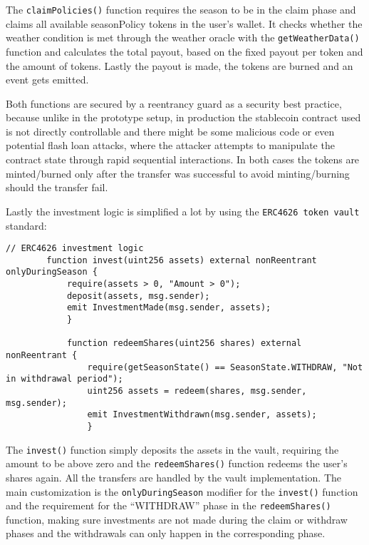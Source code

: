 \documentclass[11pt,a4paper]{article}
\begin{document}
		The \texttt{claimPolicies()} function requires the season to be in the claim phase and claims all available seasonPolicy tokens in the user's wallet.
		It checks whether the weather condition is met through the weather oracle with the \texttt{getWeatherData()} function and calculates the total payout, based on the fixed payout per token and the amount of tokens.
		Lastly the payout is made, the tokens are burned and an event gets emitted.

		Both functions are secured by a reentrancy guard as a security best practice, because unlike in the prototype setup, in production the stablecoin contract used is not directly controllable and there might be some malicious code or even potential flash loan attacks, where the attacker attempts to manipulate the contract state through rapid sequential interactions.
		In both cases the tokens are minted/burned only after the transfer was successful to avoid minting/burning should the transfer fail.

        \bigskip

		Lastly the investment logic is simplified a lot by using the \texttt{ERC4626 token vault} standard:

		\begin{lstlisting}[style=soliditystyle, caption={Excerpt: RainyDayFund.sol - Investor Functions},label={lst:contract-invest}]
		// ERC4626 investment logic
		function invest(uint256 assets) external nonReentrant onlyDuringSeason {
			require(assets > 0, "Amount > 0");
			deposit(assets, msg.sender);
			emit InvestmentMade(msg.sender, assets);
			}

			function redeemShares(uint256 shares) external nonReentrant {
				require(getSeasonState() == SeasonState.WITHDRAW, "Not in withdrawal period");
				uint256 assets = redeem(shares, msg.sender, msg.sender);
				emit InvestmentWithdrawn(msg.sender, assets);
				}
		\end{lstlisting}

		The \texttt{invest()} function simply deposits the assets in the vault, requiring the amount to be above zero and the \texttt{redeemShares()} function redeems the user's shares again.
		All the transfers are handled by the vault implementation.
		The main customization is the \texttt{onlyDuringSeason} modifier for the \texttt{invest()} function and the requirement for the \enquote{WITHDRAW} phase in the \texttt{redeemShares()} function, making sure investments are not made during the claim or withdraw phases and the withdrawals can only happen in the corresponding phase.
\end{document}

